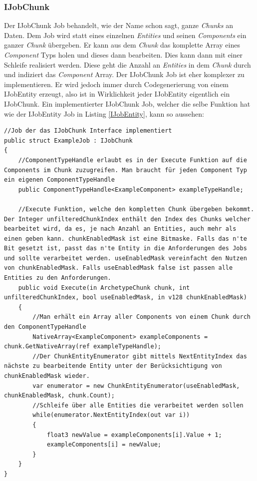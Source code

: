 \documentclass[12pt, titlepage]{article}
\DeclareRobustCommand{\#}{\adjustbox{valign=B,totalheight=.57\baselineskip}{\oldhash}}%
\begin{document}
\subsubsection{IJobChunk}
Der IJobChunk Job behandelt, wie der Name schon sagt, ganze \textit{Chunks} an Daten. Dem Job wird statt eines einzelnen \textit{Entities} und seinen \textit{Components} ein ganzer \textit{Chunk} übergeben. Er kann aus dem \textit{Chunk} das komplette Array eines \textit{Component} Typs holen und dieses dann bearbeiten. Dies kann dann mit einer Schleife realisiert werden. Diese geht die Anzahl an \textit{Entities} in dem \textit{Chunk} durch und indiziert das \textit{Component} Array. Der IJobChunk Job ist eher komplexer zu implementieren. Er wird jedoch immer durch Codegenerierung von einem IJobEntity erzeugt, also ist in Wirklichkeit jeder IJobEntity eigentlich ein IJobChunk. Ein implementierter IJobChunk Job, welcher die selbe Funktion hat wie der IJobEntity Job in Listing \ref{IJobEntity}, kann so aussehen:
\begin{lstlisting}[style=code, caption={IJobChunk Beispiel}, label=IJobChunk]
//Job der das IJobChunk Interface implementiert
public struct ExampleJob : IJobChunk
{
    //ComponentTypeHandle erlaubt es in der Execute Funktion auf die Components im Chunk zuzugreifen. Man braucht für jeden Component Typ ein eigenen ComponentTypeHandle
    public ComponentTypeHandle<ExampleComponent> exampleTypeHandle;

    //Execute Funktion, welche den kompletten Chunk übergeben bekommt. Der Integer unfilteredChunkIndex enthält den Index des Chunks welcher bearbeitet wird, da es, je nach Anzahl an Entities, auch mehr als einen geben kann. chunkEnabledMask ist eine Bitmaske. Falls das n'te Bit gesetzt ist, passt das n'te Entity in die Anforderungen des Jobs und sollte verarbeitet werden. useEnabledMask vereinfacht den Nutzen von chunkEnabledMask. Falls useEnabledMask false ist passen alle Entities zu den Anforderungen.
    public void Execute(in ArchetypeChunk chunk, int unfilteredChunkIndex, bool useEnabledMask, in v128 chunkEnabledMask)
    {
        //Man erhält ein Array aller Components von einem Chunk durch den ComponentTypeHandle
        NativeArray<ExampleComponent> exampleComponents = chunk.GetNativeArray(ref exampleTypeHandle);
        //Der ChunkEntityEnumerator gibt mittels NextEntityIndex das nächste zu bearbeitende Entity unter der Berücksichtigung von chunkEnabledMask wieder.
        var enumerator = new ChunkEntityEnumerator(useEnabledMask, chunkEnabledMask, chunk.Count);
        //Schleife über alle Entities die verarbeitet werden sollen
        while(enumerator.NextEntityIndex(out var i))
        {
            float3 newValue = exampleComponents[i].Value + 1;
            exampleComponents[i] = newValue;
        }
    }
}
\end{lstlisting}
\end{document}
